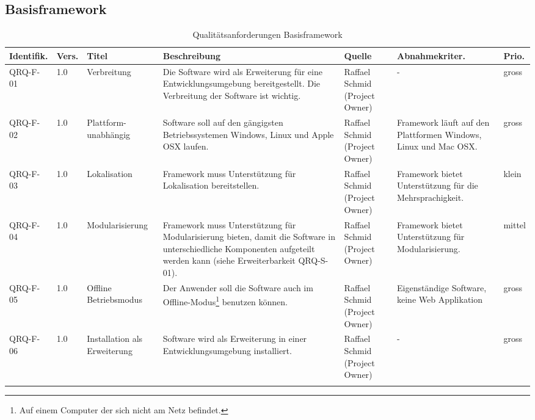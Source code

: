 \begin{landscape}
\begin{longtable}{|p{1.6cm}|p{0.7cm}|p{2.5cm}|p{4.5cm}|p{2.6cm}|p{4cm}|p{0.9cm}|}
\end{longtable}
\subsection{Basisframework}\label{anforderungen_framework}
\begin{longtable}{|p{1.6cm}|p{0.7cm}|p{2.5cm}|p{4.5cm}|p{2.6cm}|p{4cm}|p{0.9cm}|}
    \hline\textbf{Identifik.} & \textbf{Vers.}& \textbf{Titel} & \textbf{Beschreibung} & \textbf{Quelle} & \textbf{Abnahmekriter.} & \textbf{Prio.}\\\hline
   QRQ-F-01 & 1.0 & Verbreitung & Die Software wird als Erweiterung für eine Entwicklungsumgebung bereitgestellt. Die Verbreitung der Software ist wichtig. & Raffael Schmid (Project Owner) & - & gross \\\hline

   QRQ-F-02 & 1.0 & Plattform-unabhängig & Software soll auf den gängigsten Betriebssystemen Windows, Linux und Apple OSX laufen. & Raffael Schmid (Project Owner) &  Framework läuft auf den Plattformen Windows, Linux und Mac OSX. & gross \\\hline

   QRQ-F-03 & 1.0 & Lokalisation & Framework muss Unterstützung für Lokalisation bereitstellen.& Raffael Schmid (Project Owner) & Framework bietet Unterstützung für die Mehrsprachigkeit. &klein \\\hline

   QRQ-F-04 & 1.0 & Modularisierung & Framework muss Unterstützung für Modularisierung bieten, damit die Software in unterschiedliche Komponenten aufgeteilt werden kann (siehe Erweiterbarkeit QRQ-S-01). & Raffael Schmid (Project Owner) & Framework bietet Unterstützung für Modularisierung.&mittel \\\hline

   QRQ-F-05 & 1.0 & Offline Betriebsmodus & Der Anwender soll die Software auch im Offline-Modus\footnote{Auf einem Computer der sich nicht am Netz befindet.} benutzen können. & Raffael Schmid (Project Owner) & Eigenständige Software, keine Web Applikation & gross  \\\hline

   QRQ-F-06 & 1.0 & Installation als Erweiterung& Software wird als Erweiterung in einer Entwicklungsumgebung installiert. & Raffael Schmid (Project Owner) & - & gross  \\\hline
    \caption{Qualitätsanforderungen Basisframework}
\end{longtable}
\end{landscape}
